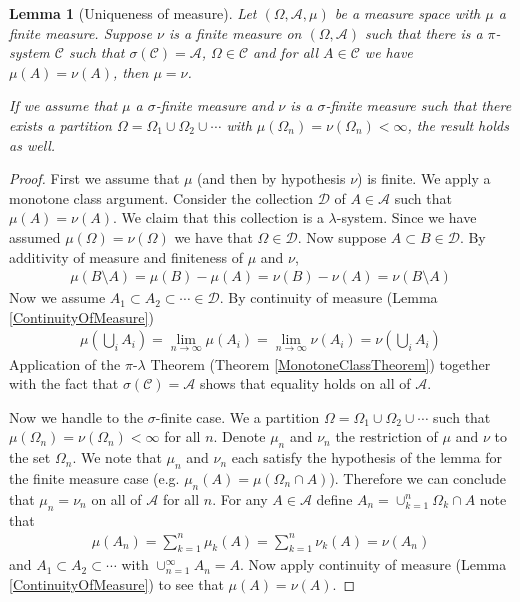 \documentclass{amsart}
\newtheorem{lem}[thm]{Lemma}
\theoremstyle{remark}
\theoremstyle{definition}
\begin{document}
\begin{lem}[Uniqueness of measure]\label{UniquenessOfMeasure}Let $(\Omega, \mathcal{A}, \mu)$ be a measure space with
  $\mu$ a finite measure.  Suppose $\nu$ is a finite
  measure on
  $(\Omega, \mathcal{A})$ such that there is a $\pi$-system
  $\mathcal{C}$ such that $\sigma(\mathcal{C})=\mathcal{A}$, $\Omega \in \mathcal{C}$ and for all $A \in
  \mathcal{C}$ we have $\mu(A) = \nu(A)$, then $\mu=\nu$.

If we assume that $\mu$ a $\sigma$-finite measure and $\nu$ is a 
$\sigma$-finite measure such that there exists a partition $\Omega =
\Omega_1 \cup \Omega_2 \cup \cdots$ with $\mu(\Omega_n) =
\nu(\Omega_n) < \infty$, the result holds as well.
\end{lem}
\begin{proof}
First we assume that $\mu$ (and then by hypothesis $\nu$) is finite.
We apply a monotone class
argument.  Consider the collection $\mathcal{D}$ of $A \in
\mathcal{A}$ such that $\mu(A) = \nu(A)$.  We claim that
this collection is a $\lambda$-system.  Since we have assumed
$\mu(\Omega) = \nu(\Omega)$ we have that $\Omega \in \mathcal{D}$.  Now suppose $A
\subset B \in \mathcal{D}$.  By additivity of measure and finiteness
of $\mu$ and $\nu$,
\begin{align*}
\mu(B \setminus A) = \mu(B) - \mu(A) = \nu(B) -\nu(A) =
\nu(B \setminus A)
\end{align*}
Now we assume $A_1 \subset A_2 \subset \cdots \in \mathcal{D}$.  By
continuity of measure (Lemma \ref{ContinuityOfMeasure}) 
\begin{align*}
\mu \left ( \bigcup_i A_i \right ) = \lim_{n \to \infty} \mu(A_i) = \lim_{n \to \infty} \nu(A_i) =
\nu \left ( \bigcup_i A_i \right )
\end{align*}
Application of the $\pi$-$\lambda$ Theorem (Theorem
\ref{MonotoneClassTheorem}) together with the fact that
$\sigma(\mathcal{C}) = \mathcal{A}$ shows that equality holds on all
of $\mathcal{A}$.

Now we handle to the $\sigma$-finite case.  We a partition
$\Omega=\Omega_1 \cup \Omega_2 \cup \cdots$ such that $\mu(\Omega_n) =
\nu(\Omega_n) < \infty$ for all $n$.  Denote $\mu_n$ and
$\nu_n$ the restriction of $\mu$ and $\nu$ to the set $\Omega_n$.  We
note that $\mu_n$ and $\nu_n$ each satisfy the hypothesis of the lemma
for the finite measure case (e.g. $\mu_n(A) = \mu(\Omega_n \cap A)$).  Therefore
we can conclude that $\mu_n = \nu_n$ on all of $\mathcal{A}$ for all
$n$.  For any
$A \in \mathcal{A}$ define $A_n = \cup_{k=1}^n \Omega_k \cap A$ note
that 
\begin{align*}
\mu (A_n) = \sum_{k=1}^n \mu_k(A) = \sum_{k=1}^n \nu_k(A)  = \nu(A_n)
\end{align*}
and $A_1 \subset A_2 \subset \cdots $ with $\cup_{n=1}^\infty A_n =
A$.  Now apply continuity of measure (Lemma \ref{ContinuityOfMeasure}) to see that $\mu(A)=\nu(A)$.
\end{proof}
\end{document}

